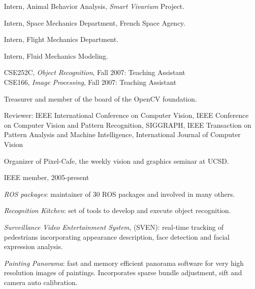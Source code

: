 \begin{llist}
Intern, Animal Behavior Analysis, {\em Smart Vivarium} Project.

Intern, Space Mechanics Department, French Space Agency.

 
Intern, Flight Mechanics Department.

 
Intern, Fluid Mechanics Modeling.

CSE252C, {\em Object Recognition}, Fall 2007: Teaching Assistant\\
CSE166, {\em Image Processing}, Fall 2007: Teaching Assistant


Treasurer and member of the board of the OpenCV foundation.

Reviewer: IEEE International Conference on Computer Vision, IEEE Conference on Computer Vision and Pattern Recognition, 
SIGGRAPH, IEEE Transaction on Pattern Analysis and Machine Intelligence, International Journal of Computer Vision

Organizer of Pixel-Cafe, the weekly vision and graphics seminar at UCSD.

IEEE member, 2005-present





{\em ROS packages}: maintainer of 30 ROS packages and involved in many others.

{\em Recognition Kitchen}: set of tools to develop and execute object recognition.

{\em Surveillance Video Entertainment System}, (SVEN): real-time tracking of pedestrians incorporating appearance 
description, face detection and facial expression analysis.

{\em Painting Panorama}: fast and memory efficient panorama software for very high resolution images of paintings.  Incorporates sparse bundle adjustment, sift and camera auto calibration.


\end{llist}
